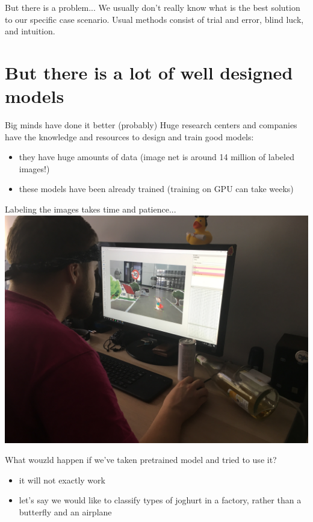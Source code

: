 \documentclass[aspectratio=1610,english]{beamer} %
\begin{document}
	\begin{frame}{But there is a problem...}
		We usually don't really know what is the best solution to our specific case scenario.
		\newline
		\newline
		Usual methods consist of trial and error, blind luck, and intuition.
	
	 \end{frame}
 
 	\section{But there is a lot of well designed models}
	\begin{frame}{Big minds have done it better (probably)}
	Huge research centers and companies have the knowledge and resources to design and train good models:
		 \begin{itemize}
		 	\item they have huge amounts of data (image net is around 14 million of labeled images!)
		 	\item these models have been already trained (training on GPU can take weeks)
		 \end{itemize}
	\end{frame}

	\begin{frame}{Labeling the images takes time and patience...}
	\includegraphics[scale=0.1]{images/kuba}
	\end{frame}

 	\begin{frame}{What wouzld happen if we've taken pretrained model and tried to use it?}
		 \begin{itemize}
		 	\item it will not exactly work
		 	\item let's say we would like to classify types of joghurt in a factory, rather than a butterfly and an airplane
		 \end{itemize}
	\end{frame}
\end{document}
